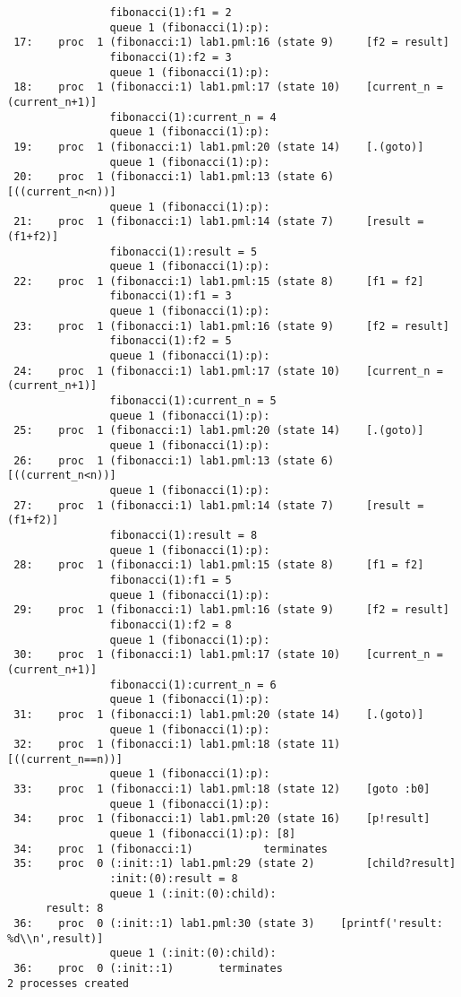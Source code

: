 \documentclass[a4paper,12pt]{report}
\begin{document}
\begin{Verbatim}
                fibonacci(1):f1 = 2
                queue 1 (fibonacci(1):p): 
 17:    proc  1 (fibonacci:1) lab1.pml:16 (state 9)     [f2 = result]
                fibonacci(1):f2 = 3
                queue 1 (fibonacci(1):p): 
 18:    proc  1 (fibonacci:1) lab1.pml:17 (state 10)    [current_n = (current_n+1)]
                fibonacci(1):current_n = 4
                queue 1 (fibonacci(1):p): 
 19:    proc  1 (fibonacci:1) lab1.pml:20 (state 14)    [.(goto)]
                queue 1 (fibonacci(1):p): 
 20:    proc  1 (fibonacci:1) lab1.pml:13 (state 6)     [((current_n<n))]
                queue 1 (fibonacci(1):p): 
 21:    proc  1 (fibonacci:1) lab1.pml:14 (state 7)     [result = (f1+f2)]
                fibonacci(1):result = 5
                queue 1 (fibonacci(1):p): 
 22:    proc  1 (fibonacci:1) lab1.pml:15 (state 8)     [f1 = f2]
                fibonacci(1):f1 = 3
                queue 1 (fibonacci(1):p): 
 23:    proc  1 (fibonacci:1) lab1.pml:16 (state 9)     [f2 = result]
                fibonacci(1):f2 = 5
                queue 1 (fibonacci(1):p): 
 24:    proc  1 (fibonacci:1) lab1.pml:17 (state 10)    [current_n = (current_n+1)]
                fibonacci(1):current_n = 5
                queue 1 (fibonacci(1):p): 
 25:    proc  1 (fibonacci:1) lab1.pml:20 (state 14)    [.(goto)]
                queue 1 (fibonacci(1):p): 
 26:    proc  1 (fibonacci:1) lab1.pml:13 (state 6)     [((current_n<n))]
                queue 1 (fibonacci(1):p): 
 27:    proc  1 (fibonacci:1) lab1.pml:14 (state 7)     [result = (f1+f2)]
                fibonacci(1):result = 8
                queue 1 (fibonacci(1):p): 
 28:    proc  1 (fibonacci:1) lab1.pml:15 (state 8)     [f1 = f2]
                fibonacci(1):f1 = 5
                queue 1 (fibonacci(1):p): 
 29:    proc  1 (fibonacci:1) lab1.pml:16 (state 9)     [f2 = result]
                fibonacci(1):f2 = 8
                queue 1 (fibonacci(1):p): 
 30:    proc  1 (fibonacci:1) lab1.pml:17 (state 10)    [current_n = (current_n+1)]
                fibonacci(1):current_n = 6
                queue 1 (fibonacci(1):p): 
 31:    proc  1 (fibonacci:1) lab1.pml:20 (state 14)    [.(goto)]
                queue 1 (fibonacci(1):p): 
 32:    proc  1 (fibonacci:1) lab1.pml:18 (state 11)    [((current_n==n))]
                queue 1 (fibonacci(1):p): 
 33:    proc  1 (fibonacci:1) lab1.pml:18 (state 12)    [goto :b0]
                queue 1 (fibonacci(1):p): 
 34:    proc  1 (fibonacci:1) lab1.pml:20 (state 16)    [p!result]
                queue 1 (fibonacci(1):p): [8]
 34:    proc  1 (fibonacci:1)           terminates
 35:    proc  0 (:init::1) lab1.pml:29 (state 2)        [child?result]
                :init:(0):result = 8
                queue 1 (:init:(0):child): 
      result: 8
 36:    proc  0 (:init::1) lab1.pml:30 (state 3)    [printf('result: %d\\n',result)]
                queue 1 (:init:(0):child): 
 36:    proc  0 (:init::1)       terminates
2 processes created
\end{Verbatim}
\end{document}
